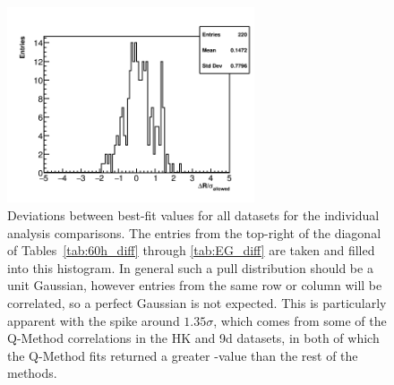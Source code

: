 \begin{figure}
\centering
\includegraphics[width=0.65\textwidth]{AllSigmas}
\caption{Deviations between best-fit \R values for all datasets for the individual analysis comparisons. The entries from the top-right of the diagonal of Tables~\ref{tab:60h_diff} through \ref{tab:EG_diff} are taken and filled into this histogram. In general such a pull distribution should be a unit Gaussian, however entries from the same row or column will be correlated, so a perfect Gaussian is not expected. This is particularly apparent with the spike around $1.35\sigma$, which comes from some of the Q-Method correlations in the HK and 9d datasets, in both of which the Q-Method fits returned a greater \R-value than the rest of the methods.}
\label{fig:AllSigmas}
\end{figure}




